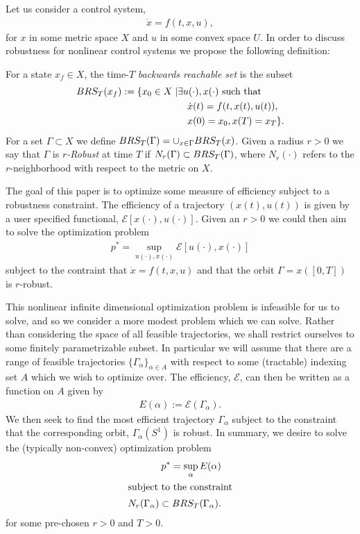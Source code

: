 Let us consider a control system, 
\begin{align}
	\dot{x} = f(t,x,u), \label{eq:control system}
\end{align}
 for $x$ in some metric space $X$ and $u$ in some convex space $U$.
 In order to discuss robustness for nonlinear control systems we propose the following definition:
\begin{definition}
    For a state $x_{f} \in X$, the time-$T$ \emph{backwards reachable set} is the subset
	\begin{align*}
		BRS_{T}( x_{f} ) := \{ x_{0} \in X \mid& \exists u(\cdot) , x(\cdot) \text{ such that } \\
			&\quad \dot{x}(t) = f(t,x(t),u(t)) ,\\
			&\quad x(0) = x_{0}, x(T) = x_{T}  \}.
	\end{align*}
	For a set $\Gamma \subset X$ we define $BRS_{T}(\Gamma) = \cup_{x \in \Gamma} BRS_{T}(x)$.
        Given a radius $r > 0$ we say that $\Gamma$ is \emph{$r$-Robust} at time $T$ if $N_{r}( \Gamma) \subset BRS_{T}( \Gamma )$,
	where $N_{r}( \cdot)$ refers to the $r$-neighborhood with respect to the metric on $X$.
\end{definition}

The goal of this paper is to optimize some measure of efficiency subject to a robustness constraint.
The efficiency of a trajectory $(x(t),u(t))$ is given by a user specified functional, $\mathcal{E}[x(\cdot),u(\cdot)]$.  Given an $r>0$ we could then aim to solve the optimization problem
\begin{align*}
    p^* = \sup_{u(\cdot),x(\cdot)} \mathcal{E}[ u(\cdot),x(\cdot) ]
\end{align*}
subject to the contraint that $\dot{x} = f(t,x,u)$ and that the orbit $\Gamma = x( [0,T])$ is $r$-robust.

This nonlinear infinite dimensional optimization problem is infeasible for us to solve, and so we consider a more modest problem which we can solve.
Rather than considering the space of all feasible trajectories,
we shall restrict ourselves to some finitely parametrizable subset.
In particular we will assume that there are a range of feasible trajectories $\{ \Gamma_{\alpha} \}_{\alpha \in A}$ with respect to some (tractable) indexing set $A$
which we wish to optimize over.
The efficiency, $\mathcal{E}$, can then be written as a function on $A$ given by
\begin{align*}
	E( \alpha) := \mathcal{E}( \Gamma_{\alpha}).
\end{align*}
We then seek to find the most efficient trajectory $\Gamma_{\alpha}$ subject to the constraint that the corresponding orbit, $\Gamma_{\alpha}(S^{1})$ is robust.
In summary, we desire to solve the (typically non-convex) optimization problem
\begin{align}
	p^{*} = \sup_{\alpha} E(\alpha) \label{eq:nonconvex}\\
\intertext{subject to the constraint}
	N_{r}(\Gamma_{\alpha}) \subset BRS_{T}(\Gamma_{\alpha}). \nonumber
\end{align}
for some pre-chosen $r >0$ and $T>0$.
